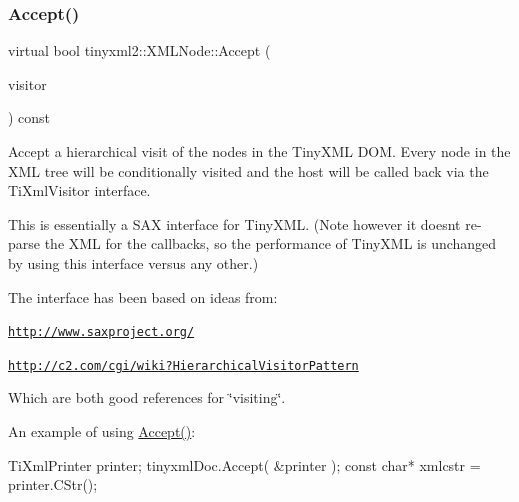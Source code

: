 \mbox{\label{classtinyxml2_1_1XMLNode_a81e66df0a44c67a7af17f3b77a152785}} 
\subsubsection{\texorpdfstring{Accept()}{Accept()}\hspace{0.1cm}{\footnotesize\ttfamily [2/2]}}
{\footnotesize\ttfamily virtual bool tinyxml2\+::\+X\+M\+L\+Node\+::\+Accept (\begin{DoxyParamCaption}\item[{\hyperlink{classtinyxml2_1_1XMLVisitor}{X\+M\+L\+Visitor} $\ast$}]{visitor }\end{DoxyParamCaption}) const\hspace{0.3cm}{\ttfamily [pure virtual]}}

Accept a hierarchical visit of the nodes in the Tiny\+X\+ML D\+OM. Every node in the X\+ML tree will be conditionally visited and the host will be called back via the Ti\+Xml\+Visitor interface.

This is essentially a S\+AX interface for Tiny\+X\+ML. (Note however it doesn\textquotesingle{}t re-\/parse the X\+ML for the callbacks, so the performance of Tiny\+X\+ML is unchanged by using this interface versus any other.)

The interface has been based on ideas from\+:


\begin{DoxyItemize}
\item \href{http://www.saxproject.org/}{\tt http\+://www.\+saxproject.\+org/}
\item \href{http://c2.com/cgi/wiki?HierarchicalVisitorPattern}{\tt http\+://c2.\+com/cgi/wiki?\+Hierarchical\+Visitor\+Pattern}
\end{DoxyItemize}

Which are both good references for \char`\"{}visiting\char`\"{}.

An example of using \hyperlink{classtinyxml2_1_1XMLNode_a81e66df0a44c67a7af17f3b77a152785}{Accept()}\+: \begin{DoxyVerb}TiXmlPrinter printer;
tinyxmlDoc.Accept( &printer );
const char* xmlcstr = printer.CStr();
\end{DoxyVerb}
 

